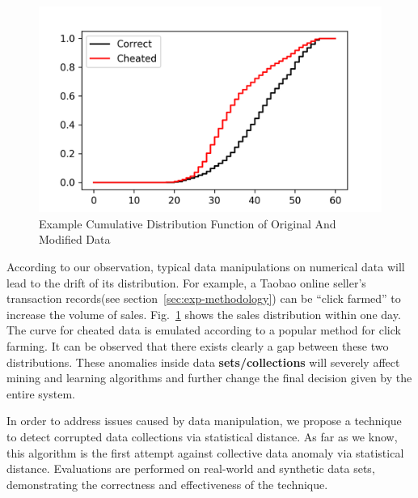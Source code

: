 \documentclass[a4paper]{IEEEtran}
\begin{document}
		\begin{figure}[!t]
			\centering
			\includegraphics[width=\linewidth]{fig/ExampleEcdf.png}
			\caption{Example Cumulative Distribution Function of Original And Modified Data}
			\label{fig:example-ecdf}
		\end{figure}
		
		According to our observation, typical data manipulations on numerical data will lead to the drift of its distribution. For example, a Taobao online seller's transaction records(see section~\ref{sec:exp-methodology}) can be ``click farmed'' to increase the volume of sales. Fig.~\ref{fig:example-ecdf} shows the sales distribution within one day. The curve for cheated data is emulated according to a popular method for click farming. It can be observed that there exists clearly a gap between these two distributions. 		
		These anomalies inside data \textbf{sets/collections} will severely affect mining and learning algorithms and further change the final decision given by the entire system.
		
		In order to address issues caused by data manipulation, we propose a technique to detect corrupted data collections via statistical distance. As far as we know, this algorithm is the first attempt against collective data anomaly via statistical distance. Evaluations are performed on real-world and synthetic data sets, demonstrating the correctness and effectiveness of the technique.
		
\end{document}
